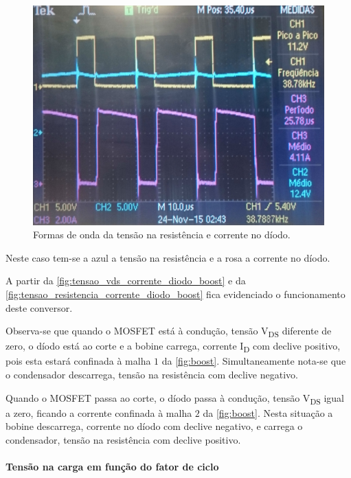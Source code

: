 \documentclass[a4paper,11pt]{article}
\numberwithin{equation}{section}
\begin{document}
\begin{figure}[H]
	\centering
	\includegraphics[keepaspectratio=true, scale=0.175]{img/figs/tensao_resistencia_corrente_diodo_boost}
	\caption{Formas de onda da tensão na resistência e corrente no díodo.}
	\label{fig:tensao_resistencia_corrente_diodo_boost}
	\vspace{-0.8em}
\end{figure}

Neste caso tem-se a azul a tensão na resistência e a rosa a corrente no díodo.

A partir da \autoref{fig:tensao_vds_corrente_diodo_boost} e da \autoref{fig:tensao_resistencia_corrente_diodo_boost} fica evidenciado o funcionamento deste conversor. 

Observa-se que quando o MOSFET está à condução, tensão V\textsubscript{DS} diferente de zero, o díodo está ao corte e a bobine carrega, corrente I\textsubscript{D} com declive positivo, pois esta estará confinada à malha $1$ da \autoref{fig:boost}. Simultaneamente nota-se que o condensador descarrega, tensão na resistência com declive negativo.

Quando o MOSFET passa ao corte, o díodo passa à condução, tensão V\textsubscript{DS} igual a zero, ficando a corrente confinada à malha $2$ da \autoref{fig:boost}. Nesta situação a bobine descarrega, corrente no díodo com declive negativo, e carrega o condensador, tensão na resistência com declive positivo.

\paragraph{Tensão na carga em função do fator de ciclo}\mbox{}\
\end{document}
